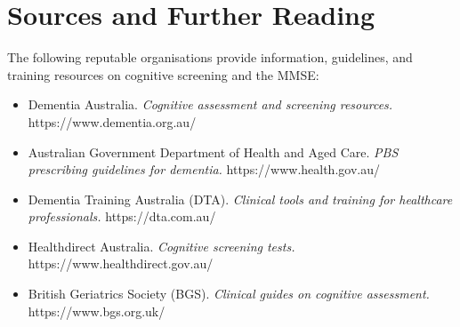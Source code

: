 \section*{Sources and Further Reading}
The following reputable organisations provide information, guidelines, and training resources on cognitive screening and the MMSE:
\begin{itemize}
    \item Dementia Australia. \textit{Cognitive assessment and screening resources.} https://www.dementia.org.au/
    \item Australian Government Department of Health and Aged Care. \textit{PBS prescribing guidelines for dementia.} https://www.health.gov.au/
    \item Dementia Training Australia (DTA). \textit{Clinical tools and training for healthcare professionals.} https://dta.com.au/
    \item Healthdirect Australia. \textit{Cognitive screening tests.} https://www.healthdirect.gov.au/
    \item British Geriatrics Society (BGS). \textit{Clinical guides on cognitive assessment.} https://www.bgs.org.uk/
\end{itemize}
